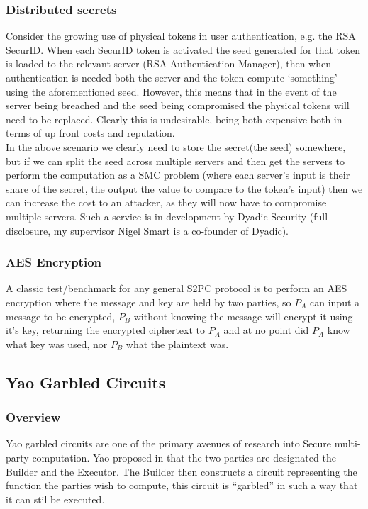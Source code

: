 \documentclass[a4paper,10pt]{article}
\begin{document}
			\subsubsection{Distributed secrets} \label{DistributedSecretApplication}
				Consider the growing use of physical tokens in user authentication, e.g. the RSA SecurID. When each SecurID token is activated the seed generated for that token is loaded to the relevant server (RSA Authentication Manager), then when authentication is needed both the server and the token compute `something' using the aforementioned seed. However, this means that in the event of the server being breached and the seed being compromised the physical tokens will need to be replaced. Clearly this is undesirable, being both expensive both in terms of up front costs and reputation.\\

				In the above scenario we clearly need to store the secret(the seed) somewhere, but if we can split the seed across multiple servers and then get the servers to perform the computation as a SMC problem (where each server's input is their share of the secret, the output the value to compare to the token's input) then we can increase the cost to an attacker, as they will now have to compromise multiple servers. Such a service is in development by Dyadic Security (full disclosure, my supervisor Nigel Smart is a co-founder of Dyadic).

			\subsubsection{AES Encryption} \label{AES_Application}
				A classic test/benchmark for any general S2PC protocol is to perform an AES encryption where the message and key are held by two parties, so $P_A$ can input a message to be encrypted, $P_B$ without knowing the message will encrypt it using it's key, returning the encrypted ciphertext to $P_A$ and at no point did $P_A$ know what key was used, nor $P_B$ what the plaintext was.

    
		\subsection{Yao Garbled Circuits} \label{Yao_Circuits}

			\subsubsection{Overview} \label{Yao_Overview}
				Yao garbled circuits are one of the primary avenues of research into Secure multi-party computation. Yao proposed in \cite{YaoOriginal} that the two parties are designated the Builder and the Executor. The Builder then constructs a circuit representing the function the parties wish to compute, this circuit is ``garbled'' in such a way that it can stil be executed.\\
\end{document}
